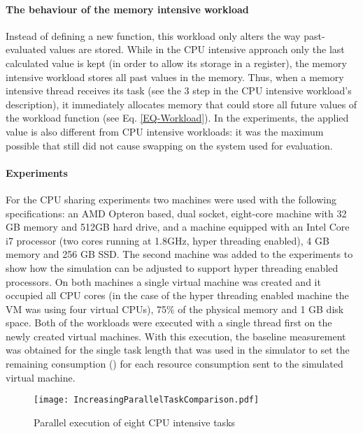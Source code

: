 \documentclass[sort, compress, 5p]{elsarticle}
\begin{document}
\paragraph{The behaviour of the memory intensive workload} Instead of defining a new function, this workload only alters the way past-evaluated  values are stored. While in the CPU intensive approach only the last calculated value is kept (in order to allow its storage in a register), the memory intensive workload stores all past values in the memory. Thus, when a memory intensive thread receives its task (see the 3 step in the CPU intensive workload's description), it immediately allocates memory that could store all  future values of the workload function (see Eq. \ref{EQ-Workload}). In the experiments, the applied  value is also different from CPU intensive workloads: it was the maximum possible that still did not cause swapping on the system used for evaluation.

\paragraph{Experiments} For the CPU sharing experiments two machines were used with the following specifications:  an AMD Opteron based, dual socket, eight-core machine with 32 GB memory and 512GB hard drive, and  a machine equipped with an Intel Core i7 processor (two cores running at 1.8GHz, hyper threading enabled), 4 GB memory and 256 GB SSD. The second machine was added to the experiments to show how the simulation can be adjusted to support hyper threading enabled processors. On both machines a single virtual machine was created and it occupied all CPU cores (in the case of the hyper threading enabled machine the VM was using four virtual CPUs), 75\% of the physical memory and 1 GB disk space. Both of the workloads were executed with a single thread first on the newly created virtual machines. With this execution, the baseline measurement was obtained for the single task length that was used in the simulator to set the remaining consumption () for each resource consumption sent to the simulated virtual machine.

\begin{figure}[tb]
\center
\texttt{[image: IncreasingParallelTaskComparison.pdf]}
\caption{Parallel execution of eight CPU intensive tasks\label{FIG-IncParTask}}
\end{figure}
\end{document}
